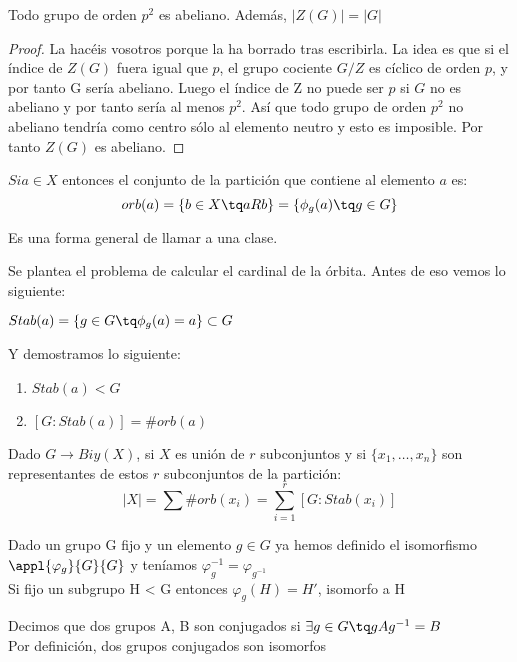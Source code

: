 \documentclass[nochap]{apuntes}
\begin{document}
\begin{theorem}
Todo grupo de orden $p^2$ es abeliano. Además, $|Z(G)| = |G|$
\end{theorem}

\begin{proof}
La hacéis vosotros porque \href{http://www.uam.es/personal_pdi/ciencias/villa/imagenes/Foto18.jpg}{\color{blue}{Orlando}} la ha borrado tras escribirla.
La idea es que si el índice de $Z(G)$ fuera igual que $p$, el grupo cociente $G/Z$ es cíclico de orden $p$, y por tanto G sería abeliano. Luego el índice de Z no puede ser $p$ si $G$ no es abeliano y por tanto sería al menos $p^2$. Así que todo grupo de orden $p^2$ no abeliano tendría como centro sólo al elemento neutro y esto es imposible. Por tanto $Z(G)$ es abeliano.
\end{proof}


\begin{defn}[{Ó}rbita]
$Si a\in X$ entonces el conjunto de la partición que contiene al elemento $a$ es:\\

$$orb(a) = \{ b\in X\tq aRb\} = \{ \phi_g(a) \tq g\in G\}$$

Es una forma general de llamar a una clase.
\end{defn}

Se plantea el problema de calcular el cardinal de la órbita.
Antes de eso vemos lo siguiente:

\begin{defn}[Estabilizador]
$Stab(a) = \{ g\in G \tq \phi_g (a) = a\} \subset G$
\end{defn}

Y demostramos lo siguiente:
\begin{enumerate}
\item $Stab(a) < G$
\item $[G: Stab(a)] = \# orb(a)$
\end{enumerate}

\obs Dado $G\longrightarrow Biy(X)$, si $X$ es unión de $r$ subconjuntos y si $\{ x_1, \hdots, x_n\} $ son representantes de estos $r$ subconjuntos de la partición:\\
$$|X| = \sum \# orb(x_i) = \sum_{i=1}^r[G:Stab(x_i)]$$

Dado un grupo G fijo y un elemento $g\in G$  ya hemos definido el isomorfismo $\appl{\varphi_g}{G}{G}$  y teníamos $\varphi_{g}^{-1}=\varphi_{g^{-1}}$\\
Si fijo un subgrupo H < G entonces $\varphi_g(H)=H'$, isomorfo a H\\
\begin{defn}[Conjugado]
 Decimos que dos grupos A, B son conjugados si $\exists g \in G \tq gAg^{-1}=B$\\
 Por definición, dos grupos conjugados son isomorfos
\end{defn}
\end{document}
